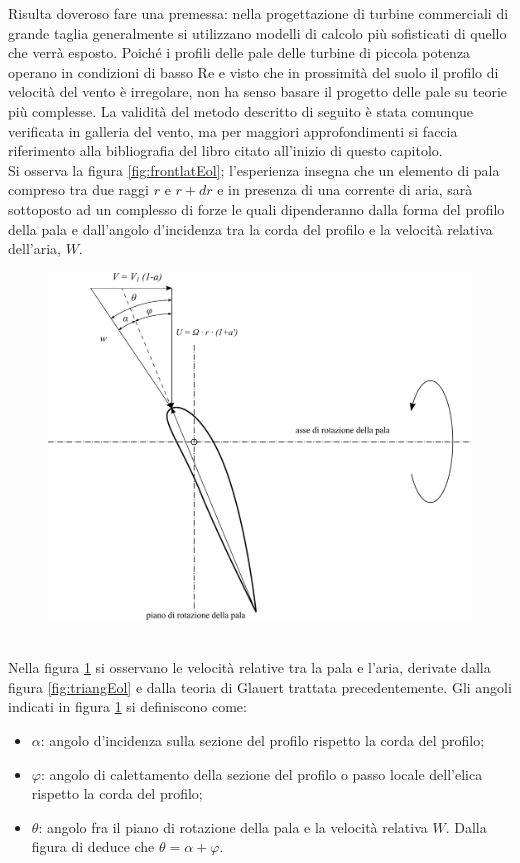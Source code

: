 Risulta doveroso fare una premessa: nella progettazione di turbine commerciali di grande taglia generalmente si utilizzano modelli di calcolo più sofisticati di quello che verrà esposto.
Poiché i profili delle pale delle turbine di piccola potenza operano in condizioni di basso Re e visto che in prossimità del suolo il profilo di velocità del vento è irregolare, non ha senso basare il progetto delle pale su teorie più complesse. La validità del metodo descritto di seguito è stata comunque verificata in galleria del vento, ma per maggiori approfondimenti si faccia riferimento alla bibliografia del libro citato all'inizio di questo capitolo.\\
Si osserva la figura \ref{fig:frontlatEol}; l'esperienza insegna che un elemento di pala compreso tra due raggi $r$ e $r+dr$ e in presenza di una corrente di aria, sarà sottoposto ad un complesso di forze le quali dipenderanno dalla forma del profilo della pala e dall'angolo d'incidenza tra la corda del profilo e la velocità relativa dell'aria, $W$.
\begin{figure}[h!]
\centering
  \includegraphics[width=.7\textwidth]{fig/triangEol2.pdf}
\caption{}
\label{fig:triangEol2}
\end{figure}
\\ Nella figura \ref{fig:triangEol2} si osservano le velocità relative tra la pala e l'aria, derivate dalla figura \ref{fig:triangEol} e dalla teoria di Glauert trattata precedentemente. Gli angoli indicati in figura \ref{fig:triangEol2} si definiscono come:
\begin{itemize}
	\item $\alpha$: angolo d'incidenza sulla sezione del profilo rispetto la corda del profilo;
	\item $\varphi$: angolo di calettamento della sezione del profilo o passo locale dell'elica rispetto la corda del profilo;
	\item $\theta$: angolo fra il piano di rotazione della pala e la velocità relativa $W$. Dalla figura di deduce che $\theta = \alpha + \varphi$.
\end{itemize}
